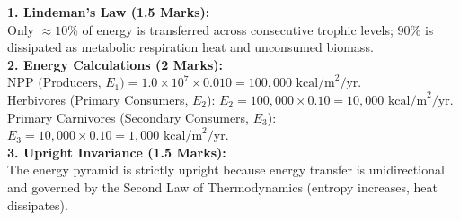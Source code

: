 \begin{solutionbox}
\textbf{1. Lindeman's Law (1.5 Marks):}\\
Only $\approx 10\%$ of energy is transferred across consecutive trophic levels; $90\%$ is dissipated as metabolic respiration heat and unconsumed biomass.\\
\textbf{2. Energy Calculations (2 Marks):}\\
$\text{NPP (Producers, } E_1) = 1.0 \times 10^7 \times 0.010 = 100{,}000\text{ kcal/m}^2/\text{yr}$.\\
Herbivores (Primary Consumers, $E_2$): $E_2 = 100{,}000 \times 0.10 = 10{,}000\text{ kcal/m}^2/\text{yr}$.\\
Primary Carnivores (Secondary Consumers, $E_3$): $E_3 = 10{,}000 \times 0.10 = 1{,}000\text{ kcal/m}^2/\text{yr}$.\\
\textbf{3. Upright Invariance (1.5 Marks):}\\
The energy pyramid is strictly upright because energy transfer is unidirectional and governed by the Second Law of Thermodynamics (entropy increases, heat dissipates).
\end{solutionbox}
\newpage
